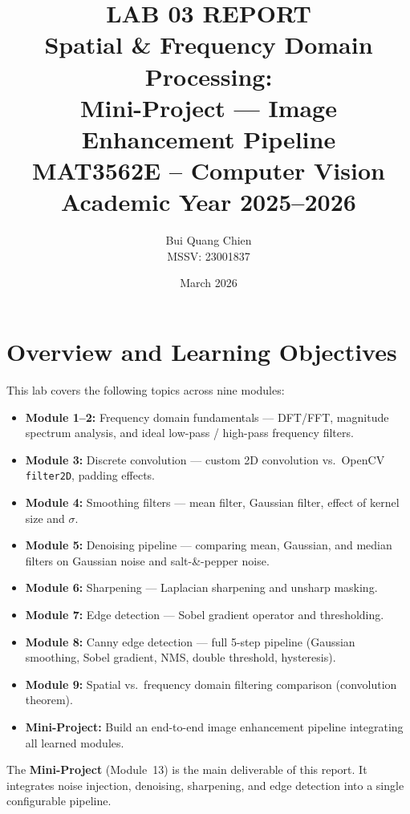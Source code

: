 \documentclass[12pt,a4paper]{article}
\title{%
  \textbf{LAB 03 REPORT}\\[0.4em]
  \large Spatial \& Frequency Domain Processing:\\
  Mini-Project --- Image Enhancement Pipeline \\[0.8em]
  \normalsize MAT3562E -- Computer Vision\\
  Academic Year 2025--2026
}
\author{
  Bui Quang Chien\\
  MSSV: 23001837
}
\date{March 2026}
\begin{document}
\maketitle
\tableofcontents
\newpage

\section{Overview and Learning Objectives}

This lab covers the following topics across nine modules:

\begin{itemize}[leftmargin=*]
  \item \textbf{Module 1--2:} Frequency domain fundamentals --- DFT/FFT, magnitude spectrum analysis, and ideal low-pass / high-pass frequency filters.
  \item \textbf{Module 3:} Discrete convolution --- custom 2D convolution vs.\ OpenCV \texttt{filter2D}, padding effects.
  \item \textbf{Module 4:} Smoothing filters --- mean filter, Gaussian filter, effect of kernel size and $\sigma$.
  \item \textbf{Module 5:} Denoising pipeline --- comparing mean, Gaussian, and median filters on Gaussian noise and salt-\&-pepper noise.
  \item \textbf{Module 6:} Sharpening --- Laplacian sharpening and unsharp masking.
  \item \textbf{Module 7:} Edge detection --- Sobel gradient operator and thresholding.
  \item \textbf{Module 8:} Canny edge detection --- full 5-step pipeline (Gaussian smoothing, Sobel gradient, NMS, double threshold, hysteresis).
  \item \textbf{Module 9:} Spatial vs.\ frequency domain filtering comparison (convolution theorem).
  \item \textbf{Mini-Project:} Build an end-to-end image enhancement pipeline integrating all learned modules.
\end{itemize}

The \textbf{Mini-Project} (Module~13) is the main deliverable of this report. It integrates noise injection, denoising, sharpening, and edge detection into a single configurable pipeline.

\end{document}
